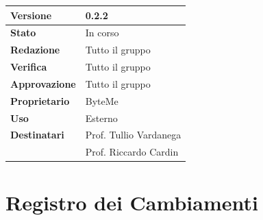 \documentclass[11pt,a4paper]{article}
\begin{document}
\begin{titlepage}
    \begin{table}[H]
        \centering
        \begin{tabular}{|l|p{5cm}|}
            \hline
            \textbf{Versione} & 0.2.2 \\
            \hline
            \textbf{Stato} & In corso \\
            \hline
            \textbf{Redazione} & Tutto il gruppo \\
            \hline
            \textbf{Verifica} & Tutto il gruppo \\
            \hline
            \textbf{Approvazione} & Tutto il gruppo \\
            \hline
            \textbf{Proprietario} & ByteMe \\
            \hline
            \textbf{Uso} & Esterno \\
            \hline
            \textbf{Destinatari} & Prof. Tullio Vardanega \\ & Prof. Riccardo Cardin \\
            \hline
        \end{tabular}
    \end{table}
    
    \vfill
\end{titlepage}

\section*{Registro dei Cambiamenti}
\end{document}
